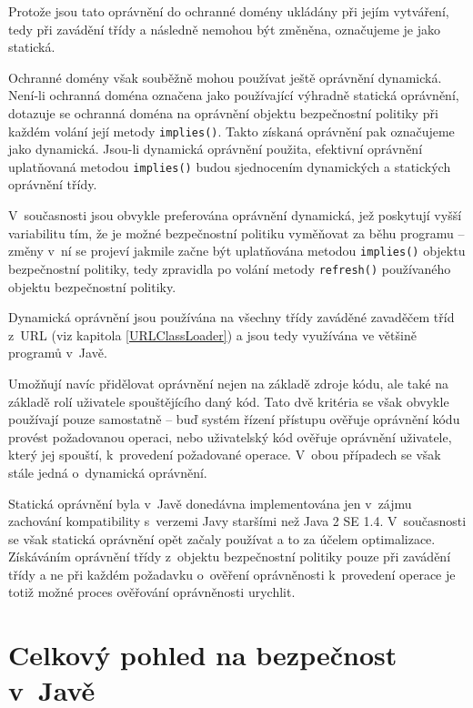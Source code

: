 Protože jsou tato oprávnění do ochranné domény ukládány při jejím vytváření, tedy při zavádění třídy a následně nemohou být změněna, označujeme je jako statická.

Ochranné domény však souběžně mohou používat ještě oprávnění dynamická. Není-li ochranná doména označena jako používající výhradně statická oprávnění,
dotazuje se ochranná doména na oprávnění objektu bezpečnostní politiky při každém volání její metody {\tt implies()}.
Takto získaná oprávnění pak označujeme jako dynamická. \cite{sourceProtectionDomain}
Jsou-li dynamická oprávnění použita, efektivní oprávnění uplatňovaná metodou {\tt implies()} budou sjednocením dynamických a statických oprávnění třídy.
\cite{sourceProtectionDomain}

V~současnosti jsou obvykle preferována oprávnění dynamická, jež poskytují vyšší variabilitu tím, že je možné bezpečnostní politiku vyměňovat za běhu
programu -- změny v~ní se projeví jakmile začne být uplatňována metodou {\tt implies()} objektu bezpečnostní politiky, tedy zpravidla po volání metody
{\tt refresh()} používaného objektu bezpečnostní politiky.

Dynamická oprávnění jsou používána na všechny třídy zaváděné zavaděčem tříd z~URL (viz kapitola \ref{URLClassLoader}) a jsou tedy využívána ve většině programů v~Javě.
\cite{sourceURLClassLoader}

Umožňují navíc přidělovat oprávnění nejen na základě zdroje kódu, ale také na základě rolí uživatele spouštějícího daný kód. Tato dvě kritéria se však
obvykle používají pouze samostatně -- buď systém řízení přístupu ověřuje oprávnění kódu provést požadovanou operaci, nebo uživatelský kód ověřuje oprávnění
uživatele, který jej spouští, k~provedení požadované operace. V~obou případech se však stále jedná o~dynamická oprávnění.

Statická oprávnění byla v~Javě donedávna implementována jen v~zájmu zachování kompatibility s~verzemi Javy staršími než Java 2 SE 1.4. \cite{sourceProtectionDomain}
V~současnosti se však statická oprávnění opět začaly používat a to za účelem optimalizace.
Získáváním oprávnění třídy z~objektu bezpečnostní politiky pouze při zavádění třídy a ne při každém požadavku o~ověření oprávněnosti k~provedení operace je totiž možné proces ověřování oprávněnosti urychlit.

\section{Celkový pohled na bezpečnost v~Javě} \label{celkovyPohled}

